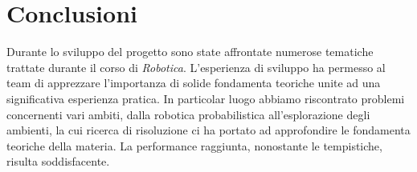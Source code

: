 \documentclass[a4paper]{article}
\begin{document}
	\section{Conclusioni}\label{sec:Conclusioni}
	Durante lo sviluppo del progetto sono state affrontate numerose tematiche
	trattate durante il corso di \textit{Robotica}. L'esperienza di sviluppo ha
	permesso al team di apprezzare l'importanza di solide fondamenta teoriche
	unite ad una significativa esperienza pratica. In particolar luogo abbiamo
	riscontrato problemi concernenti vari ambiti, dalla robotica probabilistica
	all'esplorazione degli ambienti, la cui ricerca di risoluzione ci ha
	portato ad approfondire le fondamenta teoriche della materia. La
	performance raggiunta, nonostante le tempistiche, risulta soddisfacente.
	
	\newpage
	
	
\end{document}
